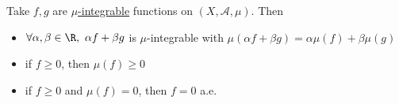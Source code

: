 \documentclass{article}
\newcommand{\1}[1]{\mathbbm{1}_{#1}}
\begin{document}

\begin{cor}
    Take $f, g$ are \hyperlink{def:integral}{$\mu$-integrable} functions on $(X, \mathcal{A}, \mu)$. Then
    \begin{itemize}
        \item $\forall \alpha, \beta \in \R, \ \alpha f + \beta g$ is $\mu$-integrable with
            $\mu(\alpha f + \beta g) = \alpha \mu(f) + \beta \mu(g)$
        \item if $f \geq 0$, then $\mu(f) \geq 0$
        \item if $f \geq 0$ and $\mu(f) = 0$, then $f=0$ a.e.
    \end{itemize}
\end{cor}

\end{document}

